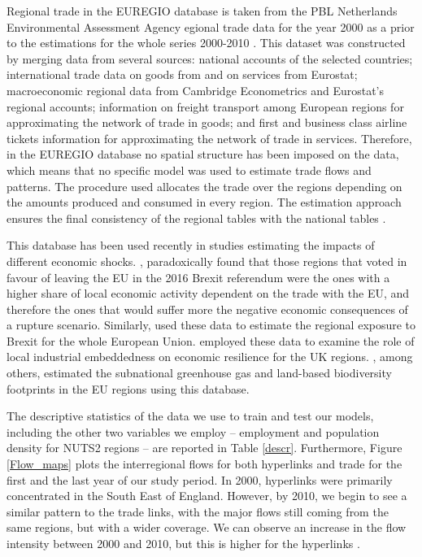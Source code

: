 \documentclass[]{interact}
\theoremstyle{plain}%
\theoremstyle{definition}
\theoremstyle{remark}
\begin{document}
Regional trade in the EUREGIO database is taken from the PBL Netherlands
Environmental Assessment Agency egional trade data for the year 2000 as
a prior to the estimations for the whole series 2000-2010 \citep[ and
\citet{thissen2013european}]{thissen2013integrated}. This dataset was
constructed by merging data from several sources: national accounts of
the selected countries; international trade data on goods from
\citep{feenstra2005world} and on services from Eurostat; macroeconomic
regional data from Cambridge Econometrics and Eurostat's regional
accounts; information on freight transport among European regions for
approximating the network of trade in goods; and first and business
class airline tickets information for approximating the network of trade
in services. Therefore, in the EUREGIO database no spatial structure has
been imposed on the data, which means that no specific model was used to
estimate trade flows and patterns. The procedure used allocates the
trade over the regions depending on the amounts produced and consumed in
every region. The estimation approach ensures the final consistency of
the regional tables with the national tables
\citep{thissen2018euregio, ivanova2019regional}.

This database has been used recently in studies estimating the impacts
of different economic shocks. \citet{los2017mismatch}, paradoxically
found that those regions that voted in favour of leaving the EU in the
2016 Brexit referendum were the ones with a higher share of local
economic activity dependent on the trade with the EU, and therefore the
ones that would suffer more the negative economic consequences of a
rupture scenario. Similarly, \citet{chen2018continental} used these data
to estimate the regional exposure to Brexit for the whole European
Union. \citet{kitsos2019role} employed these data to examine the role of
local industrial embeddedness on economic resilience for the UK regions.
\citet{wilting2020subnational}, among others, estimated the subnational
greenhouse gas and land-based biodiversity footprints in the EU regions
using this database.

The descriptive statistics of the data we use to train and test our
models, including the other two variables we employ -- employment and
population density for NUTS2 regions -- are reported in Table
\ref{descr}. Furthermore, Figure \ref{Flow_maps} plots the interregional
flows for both hyperlinks and trade for the first and the last year of
our study period. In 2000, hyperlinks were primarily concentrated in the
South East of England. However, by 2010, we begin to see a similar
pattern to the trade links, with the major flows still coming from the
same regions, but with a wider coverage. We can observe an increase in
the flow intensity between 2000 and 2010, but this is higher for the
hyperlinks .
\end{document}
